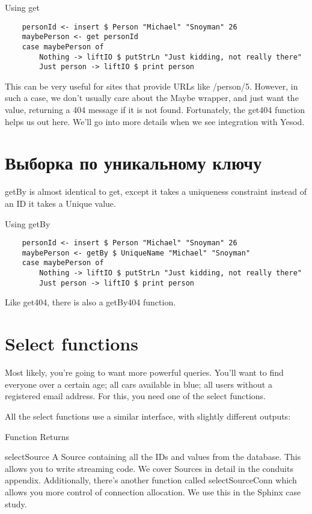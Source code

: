 Using get %

\begin{lstlisting}
    personId <- insert $ Person "Michael" "Snoyman" 26
    maybePerson <- get personId
    case maybePerson of
        Nothing -> liftIO $ putStrLn "Just kidding, not really there"
        Just person -> liftIO $ print person
\end{lstlisting}

This can be very useful for sites that provide URLs like /person/5. However, in such a case, we don't usually care about the Maybe wrapper, and just want the value, returning a 404 message if it is not found. Fortunately, the get404 function helps us out here. We'll go into more details when we see integration with Yesod.

\section{Выборка по уникальному ключу} %

getBy is almost identical to get, except it takes a uniqueness constraint instead of an ID it takes a Unique value.

Using getBy %

\begin{lstlisting}
    personId <- insert $ Person "Michael" "Snoyman" 26
    maybePerson <- getBy $ UniqueName "Michael" "Snoyman"
    case maybePerson of
        Nothing -> liftIO $ putStrLn "Just kidding, not really there"
        Just person -> liftIO $ print person
\end{lstlisting}

Like get404, there is also a getBy404 function.

\section{Select functions}

Most likely, you're going to want more powerful queries. You'll want to find everyone over a certain age; all cars available in blue; all users without a registered email address. For this, you need one of the select functions.

All the select functions use a similar interface, with slightly different outputs:


Function	Returns

selectSource	A Source containing all the IDs and values from the database. This allows you to write streaming code.
                We cover Sources in detail in the conduits appendix. Additionally, there's another function called selectSourceConn which allows you more control of connection allocation. We use this in the Sphinx case study.

